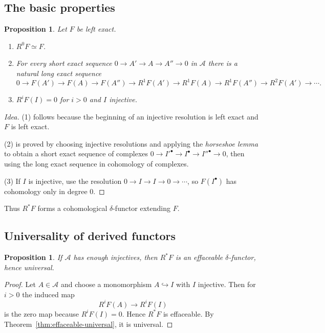 \documentclass[11pt]{article}
\theoremstyle{definition}
\theoremstyle{plain}
\newtheorem{proposition}[definition]{Proposition}
\begin{document}
\subsection{The basic properties}

\begin{proposition}\label{prop:basic-properties-derived}
Let $F$ be left exact.
\begin{enumerate}[label=(\arabic*)]
\item $R^0F\simeq F$.
\item For every short exact sequence $0\to A'\to A\to A''\to 0$ in $\mathcal{A}$ there is a natural long exact sequence
\[
0\to F(A')\to F(A)\to F(A'')\to R^1F(A')\to R^1F(A)\to R^1F(A'')\to R^2F(A')\to \cdots.
\]
\item $R^iF(I)=0$ for $i>0$ and $I$ injective.
\end{enumerate}
\end{proposition}

\begin{proof}[Idea]
(1) follows because the beginning of an injective resolution is left exact and $F$ is left exact.

(2) is proved by choosing injective resolutions and applying the \emph{horseshoe lemma} to obtain a short exact sequence of complexes
$0\to I'^\bullet\to I^\bullet\to I''^\bullet\to 0$,
then using the long exact sequence in cohomology of complexes.

(3) If $I$ is injective, use the resolution $0\to I\to I\to 0\to\cdots$, so $F(I^\bullet)$ has cohomology only in degree $0$.
\end{proof}

Thus $R^\ast F$ forms a cohomological $\delta$-functor extending $F$.

\subsection{Universality of derived functors}

\begin{proposition}\label{prop:derived-universal}
If $\mathcal{A}$ has enough injectives, then $R^\ast F$ is an effaceable $\delta$-functor, hence universal.
\end{proposition}

\begin{proof}
Let $A\in\mathcal{A}$ and choose a monomorphism $A\hookrightarrow I$ with $I$ injective.
Then for $i>0$ the induced map
\[
R^iF(A)\to R^iF(I)
\]
is the zero map because $R^iF(I)=0$. Hence $R^\ast F$ is effaceable. By Theorem~\ref{thm:effaceable-universal}, it is universal.
\end{proof}
\end{document}
